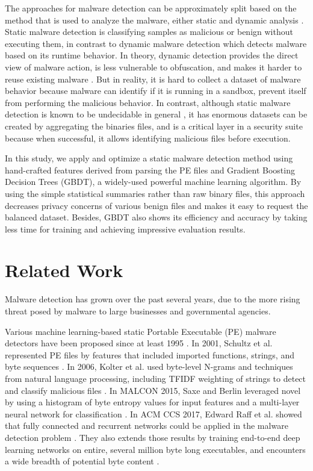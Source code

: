 \documentclass[runningheads]{llncs}
\begin{document}
The approaches for malware detection can be approximately split based on the method that is used to analyze the malware, either static and dynamic analysis \cite{egele2012survey}. Static malware detection is classifying samples as malicious or benign without executing them, in contrast to dynamic malware detection which detects malware based on its runtime behavior. In theory, dynamic detection provides the direct view of malware action, is less vulnerable to obfuscation, and makes it harder to reuse existing malware \cite{moser2007limits}. But in reality, it is hard to collect a dataset of malware behavior because malware can identify if it is running in a sandbox, prevent itself from performing the malicious behavior. In contrast, although static malware detection is known to be undecidable in general \cite{cohen1987computer}, it has enormous datasets can be created by aggregating the binaries files, and is a critical layer in a security suite because when successful, it allows identifying malicious files before execution.

In this study, we apply and optimize a static malware detection method using hand-crafted features derived from parsing the PE files and Gradient Boosting Decision Trees (GBDT), a widely-used powerful machine learning algorithm. By using the simple statistical summaries rather than raw binary files, this approach decreases privacy concerns of various benign files and makes it easy to request the balanced dataset. Besides, GBDT also shows its efficiency and accuracy by taking less time for training and achieving impressive evaluation results.

\section{Related Work}

Malware detection has grown over the past several years, due to the more rising threat posed by malware to large businesses and governmental agencies. 

Various machine learning-based static Portable Executable (PE) malware detectors have been proposed since at least 1995 \cite{kephart1995biologically}. In 2001, Schultz et al. represented PE files by features that included imported functions, strings, and byte sequences \cite{schultz2001data}. In 2006, Kolter et al. used byte-level N-grams and techniques from natural language processing, including TFIDF weighting of strings to detect and classify malicious files \cite{kolter2006learning}. In MALCON 2015, Saxe and Berlin  leveraged novel by using a histogram of byte entropy values for input features and a multi-layer neural network for classification \cite{saxe2015deep}. In ACM CCS 2017, Edward Raff et al. showed that fully connected and recurrent networks could be applied in the malware detection problem \cite{raff2017learning}. They also extends those results by training end-to-end deep learning networks on entire, several million byte long executables, and encounters a wide breadth of potential byte content \cite{raff2017malware}.
\end{document}
